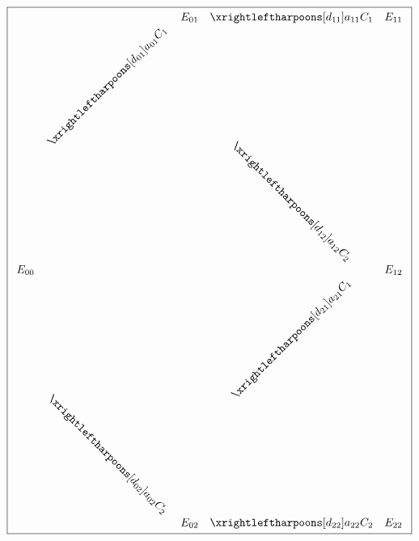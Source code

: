 \documentclass[aps,onecolumn,12pt]{revtex4}
\begin{document}
\begin{equation}
\boxed{
\begin{array}{ccccc}
 & & E_{01} & \xrightleftharpoons[d_{11}]{a_{11}C_1} & E_{11}\\
 &  \rotatebox{45}{$\xrightleftharpoons[d_{01}]{a_{01}C_1}$} &   & \rotatebox{-45}{$\xrightleftharpoons[d_{12}]{a_{12}C_2}$} & \\
E_{00} & &  & & E_{12}\\ 
  & \rotatebox{-45}{$\xrightleftharpoons[d_{02}]{a_{02}C_2}$} &  & \rotatebox{45}{$\xrightleftharpoons[d_{21}]{a_{21}C_1}$} &  \\
  & & E_{02} & \xrightleftharpoons[d_{22}]{a_{22}C_2} & E_{22}\\
 \end{array}
 }
\end{equation}
\end{document}
